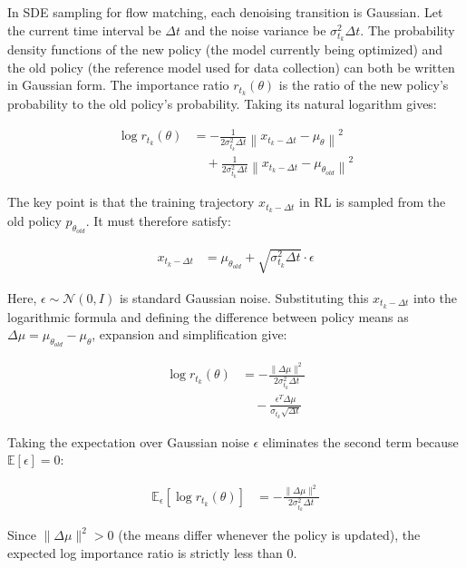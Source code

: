 In SDE sampling for flow matching, each denoising transition is Gaussian. Let the current time interval be \(\Delta t\) and the noise variance be \(\sigma_{t_k}^2\Delta t\). The probability density functions of the new policy (the model currently being optimized) and the old policy (the reference model used for data collection) can both be written in Gaussian form. The importance ratio \(r_{t_k}(\theta)\) is the ratio of the new policy's probability to the old policy's probability. Taking its natural logarithm gives:

\[
\begin{aligned}
\log r_{t_k}(\theta)
&=
-\frac{1}{2\sigma_{t_k}^2\Delta t}
\left\|x_{t_k-\Delta t}-\mu_\theta\right\|^2
\\
&\quad+
\frac{1}{2\sigma_{t_k}^2\Delta t}
\left\|x_{t_k-\Delta t}-\mu_{\theta_{old}}\right\|^2
\end{aligned}
\]

The key point is that the training trajectory \(x_{t_k-\Delta t}\) in RL is sampled from the old policy \(p_{\theta_{old}}\). It must therefore satisfy:

\[
\begin{aligned}
x_{t_k-\Delta t}
&=
\mu_{\theta_{old}}+\sqrt{\sigma_{t_k}^2\Delta t}\cdot\epsilon
\end{aligned}
\]

Here, \(\epsilon\sim\mathcal{N}(0,I)\) is standard Gaussian noise. Substituting this \(x_{t_k-\Delta t}\) into the logarithmic formula and defining the difference between policy means as \(\Delta\mu=\mu_{\theta_{old}}-\mu_\theta\), expansion and simplification give:

\[
\begin{aligned}
\log r_{t_k}(\theta)
&=
-\frac{\|\Delta\mu\|^2}{2\sigma_{t_k}^2\Delta t}
\\
&\quad-
\frac{\epsilon^T\Delta\mu}{\sigma_{t_k}\sqrt{\Delta t}}
\end{aligned}
\]

Taking the expectation over Gaussian noise \(\epsilon\) eliminates the second term because \(\mathbb{E}[\epsilon]=0\):

\[
\begin{aligned}
\mathbb{E}_{\epsilon}\left[\log r_{t_k}(\theta)\right]
&=
-\frac{\|\Delta\mu\|^2}{2\sigma_{t_k}^2\Delta t}
\end{aligned}
\]

Since \(\|\Delta\mu\|^2>0\) (the means differ whenever the policy is updated), the expected log importance ratio is strictly less than 0.

